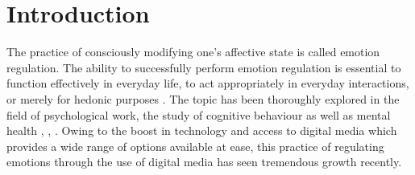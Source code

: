 \documentclass[acmtog]{acmart}
\begin{document}







\maketitle

\section{Introduction}
The practice of consciously modifying one's affective state is called emotion regulation. The ability to successfully perform emotion regulation is essential to function effectively in everyday life, to act appropriately in everyday interactions, or merely for hedonic purposes \cite{wadley2020digital}. The topic has been thoroughly explored in the field of psychological work, the study of cognitive behaviour as well as mental health \cite{mcrae2020emotion}, \cite{gross2015emotion}, \cite{gross2014emotion}. Owing to the boost in technology and access to digital media which provides a wide range of options available at ease, this practice of regulating emotions through the use of digital media has seen tremendous growth recently. 
\end{document}
